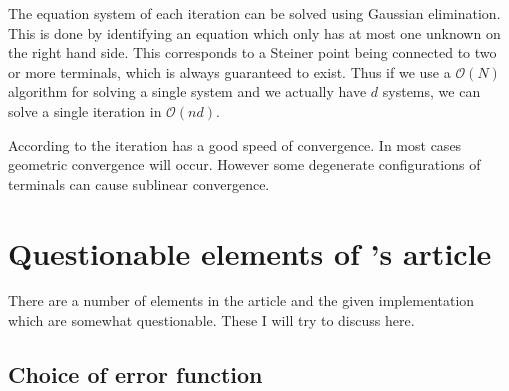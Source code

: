 The equation system of each iteration can be solved using Gaussian elimination.
This is done by identifying an equation which only has at most one unknown on the right
hand side. This corresponds to a Steiner point being connected to two or more
terminals, which is always guaranteed to exist. Thus if we use a $\mathcal
O(N)$ algorithm for solving a single system and we actually have $d$ systems, we
can solve a single iteration in $\mathcal{O}(n d)$.

According to \textcite[p.~150]{smith1992} the iteration has a good speed of
convergence. In most cases geometric convergence will occur. However some
degenerate configurations of terminals can cause sublinear convergence.

\section{Questionable elements of \citeauthor{smith1992}'s article}
\label{sec:quest-elem-smiths}

There are a number of elements in the article and the given
implementation~\cite{smith1992} which are somewhat questionable. These I will
try to discuss here.

\subsection{Choice of error function}
\label{sec:choice-error-funct}

